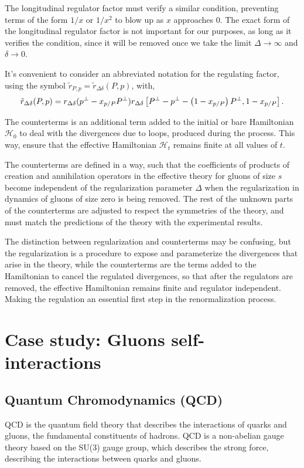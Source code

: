 \documentclass[11pt,a4paper,twoside,pdf]{article}
\numberwithin{equation}{section}
\begin{document}
The longitudinal regulator factor must verify a similar condition, preventing terms
of the form $1/x$ or $1/x^2$ to blow up as $x$ approaches 0. The exact form of the 
longitudinal regulator factor is not important for our purposes, as long as it 
verifies the condition, since it will be removed once we take the
limit $\Delta \to \infty$ and $\delta \to 0$.

It's convenient to consider an abbreviated notation for the regulating factor, 
using the symbol $\tilde{r}_{P, p} = \tilde{r}_{\Delta \delta} (P,p)$, with,
\begin{equation}
    \tilde{r}_{\Delta \delta} (P,p) = r_{\Delta \delta} (p^\perp - x_{p/P}P^\perp) 
    r_{\Delta \delta}\left[ P^\perp-p^\perp-\left( 1-x_{p/P} \right)P^\perp, 1-x_{p/P} \right].
\end{equation}

The counterterms is an additional term added to the initial or bare Hamiltonian 
$\mathcal{H}_0$ to deal with the divergences due to loops, produced during the 
process. This way, ensure that the effective Hamiltonian $\mathcal{H}_t$ remains 
finite at all values of $t$.

The counterterms are defined in a way, such that the coefficients of products 
of creation and annihilation operators in the effective theory for gluons of size $s$
become independent of the regularization parameter $\Delta$ when the regularization
in dynamics of gluons of size zero is being removed. The rest of the unknown parts 
of the counterterms are adjusted to respect the symmetries of the theory, and must 
match the predictions of the theory with the experimental results.

The distinction between regularization and counterterms may be confusing, but the
regularization is a procedure to expose and parameterize the divergences that arise
in the theory, while the counterterms are the terms added to the Hamiltonian to 
cancel the regulated divergences, so that after the regulators are removed, the 
effective Hamiltonian remains finite and regulator independent. Making the 
regulation an essential first step in the renormalization process.

\newpage

\section{Case study: Gluons self-interactions} \label{sec:cases}

\subsection{Quantum Chromodynamics (QCD)}
QCD is the quantum field theory that describes the
interactions of quarks and gluons, the fundamental constituents of hadrons.
QCD is a non-abelian gauge theory based on the SU(3) gauge group, which describes
the strong force, describing the interactions between quarks and gluons.
\end{document}
